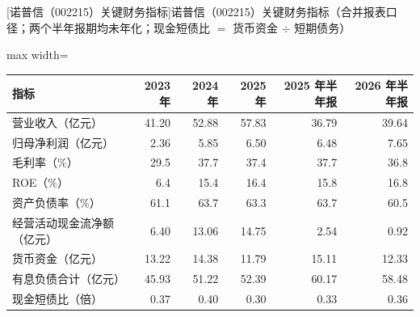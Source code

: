 \begin{center}\small\setlength{\tabcolsep}{3.4pt}
[诺普信（002215）关键财务指标]{诺普信（002215）关键财务指标（合并报表口径；两个半年报期均未年化；现金短债比 $=$ 货币资金 $\div$ 短期债务）}
\begin{adjustbox}{max width=\textwidth}
\begin{tabular}{@{}lrrrrr@{}}
\toprule
指标 & 2023 年 & 2024 年 & 2025 年 & 2025 年半年报 & 2026 年半年报 \\
\midrule
营业收入（亿元） & 41.20 & 52.88 & 57.83 & 36.79 & 39.64 \\
归母净利润（亿元） & 2.36 & 5.85 & 6.50 & 6.48 & 7.65 \\
毛利率（\%） & 29.5 & 37.7 & 37.4 & 37.7 & 36.8 \\
ROE（\%） & 6.4 & 15.4 & 16.4 & 15.8 & 16.8 \\
资产负债率（\%） & 61.1 & 63.7 & 63.3 & 63.7 & 60.5 \\
经营活动现金流净额（亿元） & 6.40 & 13.06 & 14.75 & 2.54 & 0.92 \\
货币资金（亿元） & 13.22 & 14.38 & 11.79 & 15.11 & 12.33 \\
有息负债合计（亿元） & 45.93 & 51.22 & 52.39 & 60.17 & 58.48 \\
现金短债比（倍） & 0.37 & 0.40 & 0.30 & 0.33 & 0.36 \\
\bottomrule
\end{tabular}
\end{adjustbox}
\end{center}

